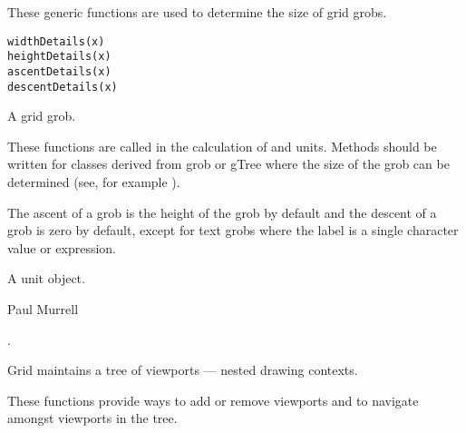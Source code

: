 %
\begin{Description}\relax
These generic functions are used to determine the size of grid grobs.
\end{Description}
%
\begin{Usage}
\begin{verbatim}
widthDetails(x)
heightDetails(x)
ascentDetails(x)
descentDetails(x)
\end{verbatim}
\end{Usage}
%
\begin{Arguments}
\begin{ldescription}
\item[\code{x}]  A grid grob. 
\end{ldescription}
\end{Arguments}
%
\begin{Details}\relax
These functions are called in the calculation of
 and  units.
Methods should be written for classes derived from grob or gTree
where the size of the grob can be determined (see, for example
).

The ascent of a grob is the height of the grob by default and
the descent of a grob is zero by default, except for text grobs
where the label is a single character value or expression.
\end{Details}
%
\begin{Value}
A unit object.
\end{Value}
%
\begin{Author}\relax
 Paul Murrell 
\end{Author}
%
\begin{SeeAlso}\relax
{}.
\end{SeeAlso}
%
\begin{Description}\relax
Grid maintains a tree of viewports --- nested drawing
contexts. 

These functions provide ways to add or remove viewports
and to navigate amongst viewports in the tree.
\end{Description}
